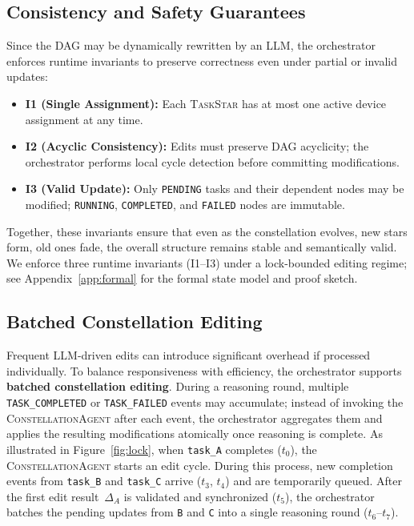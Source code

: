 \documentclass[10pt]{article} %
\newcommand{\cagent}{\textsc{ConstellationAgent}\xspace}
\newcommand{\TaskStar}{\textsc{TaskStar}\xspace}
\begin{document}
\subsection{Consistency and Safety Guarantees}
\label{subsec:orchestrator-consistency}
Since the DAG may be dynamically rewritten by an LLM, the orchestrator enforces runtime invariants to preserve correctness even under partial or invalid updates:
\begin{itemize}
  \item \textbf{I1 (Single Assignment):} Each \TaskStar has at most one active device assignment at any time.  
  \item \textbf{I2 (Acyclic Consistency):} Edits must preserve DAG acyclicity; the orchestrator performs local cycle detection before committing modifications.  
  \item \textbf{I3 (Valid Update):} Only \texttt{PENDING} tasks and their dependent nodes may be modified; \texttt{RUNNING}, \texttt{COMPLETED}, and \texttt{FAILED} nodes are immutable. 
\end{itemize}
Together, these invariants ensure that even as the constellation evolves, new stars form, old ones fade, the overall structure remains stable and semantically valid. We enforce three runtime invariants (I1--I3) under a lock-bounded editing regime; see Appendix~\ref{app:formal} for the formal state model and proof sketch.

\subsection{Batched Constellation Editing}
Frequent LLM-driven edits can introduce significant overhead if processed individually. To balance responsiveness with efficiency, the orchestrator supports \textbf{batched constellation editing}. During a reasoning round, multiple \texttt{TASK\_COMPLETED} or \texttt{TASK\_FAILED} events may accumulate; instead of invoking the \cagent after each event, the orchestrator aggregates them and applies the resulting modifications atomically once reasoning is complete. As illustrated in Figure~\ref{fig:lock}, when \texttt{task\_A} completes ($t_0$), the \cagent starts an edit cycle. During this process, new completion events from \texttt{task\_B} and \texttt{task\_C} arrive ($t_3$, $t_4$) and are temporarily queued. After the first edit result~$\Delta_A$ is validated and synchronized ($t_5$), the orchestrator batches the pending updates from \texttt{B} and \texttt{C} into a single reasoning round ($t_6$–$t_7$).
\end{document}
